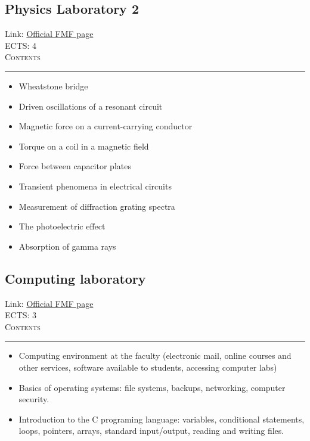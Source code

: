 \documentclass[11pt, a4paper]{article}
\newenvironment{course}[3]{
\subsection{#1}%
Link: \href{#2}{Official FMF page}\\%
ECTS: #3%
\vspace{1ex}
\\
{\large \textsc{Contents}}\\[-0.9ex]%
\rule{\textwidth}{0.5pt}
\vspace{-3ex}
}
{}
\newenvironment{chapter}[1]{
\begin{tcolorbox}[title=#1, breakable]
}
{\end{tcolorbox}}
\begin{document}
\begin{course}{Physics Laboratory 2}{https://www.fmf.uni-lj.si/en/study-physics/programmes/1fiz/2020/7000777/courses/1143/}{4}
    \label{physics-laboratory-2}

    \begin{chapter}{Experiments}
        \begin{itemize}
        
            \item Wheatstone bridge

            \item Driven oscillations of a resonant circuit

            \item Magnetic force on a current-carrying conductor

            \item Torque on a coil in a magnetic field

            \item Force between capacitor plates

            \item Transient phenomena in electrical circuits

            \item Measurement of diffraction grating spectra

            \item The photoelectric effect

            \item Absorption of gamma rays
        
        \end{itemize}
    \end{chapter}
\end{course}

\begin{course}{Computing laboratory}{https://www.fmf.uni-lj.si/en/study-physics/programmes/1fiz/2018/7000777/courses/525/}{3}
    \label{computing-laboratory}

    \begin{chapter}{Material}
        \begin{itemize}
        
            \item Computing environment at the faculty (electronic mail, online courses and other services, software available to students, accessing computer labs)

            \item Basics of operating systems: file systems, backups, networking, computer security.

            \item Introduction to the C programing language: variables, conditional statements, loops, pointers, arrays, standard input/output, reading and writing files.
        
        \end{itemize}
    \end{chapter}
\end{course}
\end{document}

